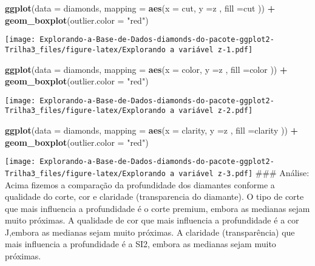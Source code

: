 \documentclass[
]{article}
\newenvironment{Shaded}{\begin{snugshade}}{\end{snugshade}}
\newcommand{\DataTypeTok}[1]{\textcolor[rgb]{0.13,0.29,0.53}{#1}}
\newcommand{\KeywordTok}[1]{\textcolor[rgb]{0.13,0.29,0.53}{\textbf{#1}}}
\newcommand{\NormalTok}[1]{#1}
\newcommand{\OperatorTok}[1]{\textcolor[rgb]{0.81,0.36,0.00}{\textbf{#1}}}
\newcommand{\StringTok}[1]{\textcolor[rgb]{0.31,0.60,0.02}{#1}}
\begin{document}
\begin{Shaded}
\begin{Highlighting}[]
\KeywordTok{ggplot}\NormalTok{(}\DataTypeTok{data =}\NormalTok{ diamonds, }\DataTypeTok{mapping =} \KeywordTok{aes}\NormalTok{(}\DataTypeTok{x =}\NormalTok{ cut, }\DataTypeTok{y =}\NormalTok{z , }\DataTypeTok{fill =}\NormalTok{cut )) }\OperatorTok{+}\StringTok{ }\KeywordTok{geom_boxplot}\NormalTok{(}\DataTypeTok{outlier.color =} \StringTok{"red"}\NormalTok{)}
\end{Highlighting}
\end{Shaded}

\texttt{[image: Explorando-a-Base-de-Dados-diamonds-do-pacote-ggplot2-Trilha3\_files/figure-latex/Explorando a variável z-1.pdf]}

\begin{Shaded}
\begin{Highlighting}[]
\KeywordTok{ggplot}\NormalTok{(}\DataTypeTok{data =}\NormalTok{ diamonds, }\DataTypeTok{mapping =} \KeywordTok{aes}\NormalTok{(}\DataTypeTok{x =}\NormalTok{ color, }\DataTypeTok{y =}\NormalTok{z , }\DataTypeTok{fill =}\NormalTok{color )) }\OperatorTok{+}\StringTok{ }\KeywordTok{geom_boxplot}\NormalTok{(}\DataTypeTok{outlier.color =} \StringTok{"red"}\NormalTok{)}
\end{Highlighting}
\end{Shaded}

\texttt{[image: Explorando-a-Base-de-Dados-diamonds-do-pacote-ggplot2-Trilha3\_files/figure-latex/Explorando a variável z-2.pdf]}

\begin{Shaded}
\begin{Highlighting}[]
\KeywordTok{ggplot}\NormalTok{(}\DataTypeTok{data =}\NormalTok{ diamonds, }\DataTypeTok{mapping =} \KeywordTok{aes}\NormalTok{(}\DataTypeTok{x =}\NormalTok{ clarity, }\DataTypeTok{y =}\NormalTok{z , }\DataTypeTok{fill =}\NormalTok{clarity )) }\OperatorTok{+}\StringTok{ }\KeywordTok{geom_boxplot}\NormalTok{(}\DataTypeTok{outlier.color =} \StringTok{"red"}\NormalTok{)}
\end{Highlighting}
\end{Shaded}

\texttt{[image: Explorando-a-Base-de-Dados-diamonds-do-pacote-ggplot2-Trilha3\_files/figure-latex/Explorando a variável z-3.pdf]}
\#\#\# Análise: Acima fizemos a comparação da profundidade dos diamantes
conforme a qualidade do corte, cor e claridade (transparencia do
diamante). O tipo de corte que mais influencia a profundidade é o corte
premium, embora as medianas sejam muito próximas. A qualidade de cor que
mais influencia a profundidade é a cor J,embora as medianas sejam muito
próximas. A claridade (transparência) que mais influencia a profundidade
é a SI2, embora as medianas sejam muito próximas.
\end{document}

